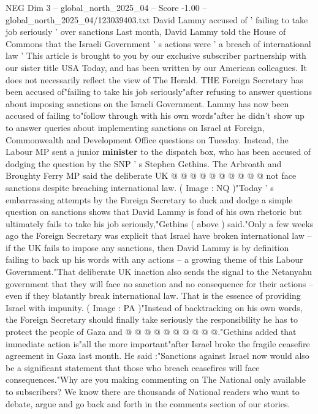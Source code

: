 \begin{textsample}{NEG Dim 3 – global\_north\_2025\_04 – Score -1.00 – global\_north\_2025\_04/123039403.txt}  \label{ex:f3_neg_402}
David Lammy accused of ' failing to take job seriously ' over sanctions Last month, David Lammy told the House of Commons that the Israeli Government ' s actions were ' a breach of international law ' This article is brought to you by our exclusive subscriber partnership with our sister title USA Today, and has been written by our American colleagues.
It does not necessarily reflect the view of The Herald.
THE Foreign Secretary has been accused of"failing to take his job seriously"after refusing to answer questions about imposing sanctions on the Israeli Government.
Lammy has now been accused of failing to"follow through with his own words"after he didn't show up to answer queries about implementing sanctions on Israel at Foreign, Commonwealth and Development Office questions on Tuesday.
Instead, the Labour MP sent a junior \textbf{minister} to the dispatch box, who has been accused of dodging the question by the SNP ' s Stephen Gethins.
The Arbroath and Broughty Ferry MP said the deliberate UK @ @ @ @ @ @ @ @ @ @ not face sanctions despite breaching international law. ( Image : NQ )"Today ' s embarrassing attempts by the Foreign Secretary to duck and dodge a simple question on sanctions shows that David Lammy is fond of his own rhetoric but ultimately fails to take his job seriously,"Gethins ( above ) said."Only a few weeks ago the Foreign Secretary was explicit that Israel have broken international law -- if the UK fails to impose any sanctions, then David Lammy is by definition failing to back up his words with any actions -- a growing theme of this Labour Government."That deliberate UK inaction also sends the signal to the Netanyahu government that they will face no sanction and no consequence for their actions -- even if they blatantly break international law.
That is the essence of providing Israel with impunity. ( Image : PA )"Instead of backtracking on his own words, the Foreign Secretary should finally take seriously the responsibility he has to protect the people of Gaza and @ @ @ @ @ @ @ @ @ @."Gethins added that immediate action is"all the more important"after Israel broke the fragile ceasefire agreement in Gaza last month.
He said :"Sanctions against Israel now would also be a significant statement that those who breach ceasefires will face consequences."Why are you making commenting on The National only available to subscribers?
We know there are thousands of National readers who want to debate, argue and go back and forth in the comments section of our stories.

\end{textsample}
